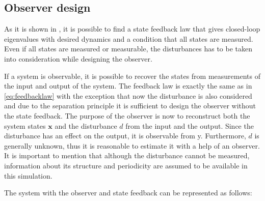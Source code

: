 \subsection{Observer design}
\label{observer}

As it is shown in , it is possible to find a state feedback law that gives closed-loop eigenvalues with desired dynamics and a condition that all states are measured. Even if all states are measured or measurable, the disturbances has to be taken into consideration while designing the observer. 

If a system is observable, it is possible to recover the states from measurements of the input and output of the system. The feedback law is exactly the same as in \eqref{eq:feedbacklaw} with the exception that now the disturbance is also considered and due to the separation principle it is sufficient to design the observer without the state feedback. The purpose of the observer is now to reconstruct both the system states $\mathbf{x}$ and the disturbance $d$ from the input and the output. Since the disturbance has an effect on the output, it is observable from y. Furthermore, $d$ is generally unknown, thus it is reasonable to estimate it with a help of an observer. It is important to mention that although the disturbance cannot be measured, information about its structure and periodicity are assumed to be available in this simulation. 

The system with the observer and state feedback can be represented as follows: 




